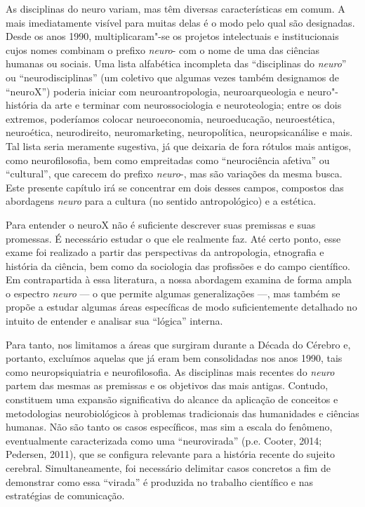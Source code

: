 As disciplinas do neuro variam, mas têm diversas características em
comum. A mais imediatamente visível para muitas delas é o modo pelo qual
são designadas. Desde os anos 1990, multiplicaram"-se os projetos
intelectuais e institucionais cujos nomes combinam o prefixo
\emph{neuro}- com o nome de uma das ciências humanas ou sociais. Uma
lista alfabética incompleta das ``disciplinas do \emph{neuro}'' ou
``neurodisciplinas'' (um coletivo que algumas vezes também designamos de
``neuroX'') poderia iniciar com neuroantropologia, neuroarqueologia e
neuro"-história da arte e terminar com neurossociologia e neuroteologia;
entre os dois extremos, poderíamos colocar neuroeconomia, neuroeducação,
neuroestética, neuroética, neurodireito, neuromarketing, neuropolítica,
neuropsicanálise e mais. Tal lista seria meramente sugestiva, já que
deixaria de fora rótulos mais antigos, como neurofilosofia, bem como
empreitadas como ``neurociência afetiva'' ou ``cultural'', que carecem
do prefixo \emph{neuro}-, mas são variações da mesma busca. Este
presente capítulo irá se concentrar em dois desses campos, compostos das
abordagens \emph{neuro} para a cultura (no sentido antropológico) e a
estética.

Para entender o neuroX não é suficiente descrever suas premissas e suas
promessas. É necessário estudar o que ele realmente faz. Até certo
ponto, esse exame foi realizado a partir das perspectivas da
antropologia, etnografia e história da ciência, bem como da sociologia
das profissões e do campo científico. Em contrapartida à essa
literatura, a nossa abordagem examina de forma ampla o espectro
\emph{neuro} --- o que permite algumas generalizações ---, mas também se
propõe a estudar algumas áreas específicas de modo suficientemente
detalhado no intuito de entender e analisar sua ``lógica'' interna.

Para tanto, nos limitamos a áreas que surgiram durante a Década do
Cérebro e, portanto, excluímos aquelas que já eram bem consolidadas nos
anos 1990, tais como neuropsiquiatria e neurofilosofia. As disciplinas
mais recentes do \emph{neuro} partem das mesmas as premissas e os
objetivos das mais antigas. Contudo, constituem uma expansão
significativa do alcance da aplicação de conceitos e metodologias
neurobiológicos à problemas tradicionais das humanidades e ciências
humanas. Não são tanto os casos específicos, mas sim a escala do
fenômeno, eventualmente caracterizada como uma ``neurovirada'' (p.e.
Cooter, 2014; Pedersen, 2011), que se configura relevante para a
história recente do sujeito cerebral. Simultaneamente, foi necessário
delimitar casos concretos a fim de demonstrar como essa ``virada'' é
produzida no trabalho científico e nas estratégias de comunicação.

